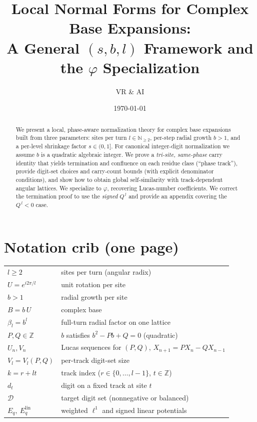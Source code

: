 \documentclass[11pt]{article}
\title{\textbf{Local Normal Forms for Complex Base Expansions:\\
A General $(s,b,l)$ Framework and the $\varphi$ Specialization}}
\author{VR \& AI}
\date{\today}
\theoremstyle{definition}
\theoremstyle{remark}
\newcommand{\N}{\mathbb{N}}
\begin{document}
\maketitle

\section*{Notation crib (one page)}
\begin{tabular}{ll}
$l\ge2$ & sites per turn (angular radix)\\
$U=e^{i2\pi/l}$ & unit rotation per site\\
$b>1$ & radial growth per site\\
$B=b\,U$ & complex base\\
$\beta_l=b^l$ & full-turn radial factor on one lattice\\
$P,Q\in\mathbb Z$ & $b$ satisfies $b^2-Pb+Q=0$ (quadratic)\\
$U_n,V_n$ & Lucas sequences for $(P,Q)$, $X_{n+1}=P X_n-Q X_{n-1}$\\
$V_l=V_l(P,Q)$ & per-track digit-set size\\
$k=r+lt$ & track index ($r\in\{0,\dots,l-1\}$, $t\in\mathbb Z$)\\
$d_t$ & digit on a fixed track at site $t$\\
$\mathcal D$ & target digit set (nonnegative or balanced)\\
$E_q,\ E_q^{\mathrm{lin}}$ & weighted $\ell^1$ and signed linear potentials\\
\end{tabular}

\begin{abstract}
We present a local, phase-aware normalization theory for complex base expansions built from three parameters: sites per turn $l\in\N_{\ge2}$, per-step radial growth $b>1$, and a per-level shrinkage factor $s\in(0,1]$. For canonical integer-digit normalization we assume $b$ is a quadratic algebraic integer. We prove a \emph{tri-site, same-phase} carry identity that yields termination and confluence on each residue class (``phase track''), provide digit-set choices and carry-count bounds (with explicit denominator conditions), and show how to obtain global self-similarity with track-dependent angular lattices. We specialize to $\varphi$, recovering Lucas-number coefficients. We correct the termination proof to use the \emph{signed} $Q^{\,l}$ and provide an appendix covering the $Q^{\,l}<0$ case.
\end{abstract}
\end{document}
